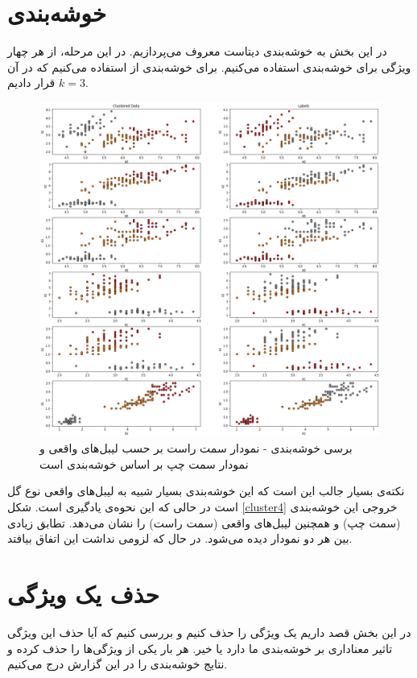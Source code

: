 \documentclass[a4paper]{article}
\begin{document}
\begin{large}
\section{خوشه‌بندی 
}
در این بخش به خوشه‌بندی دیتاست معروف 
می‌پردازیم. در این مرحله، از هر چهار ویژگی برای خوشه‌بندی استفاده می‌کنیم. برای خوشه‌بندی از 
استفاده می‌کنیم که در آن 
$k=3$
قرار دادیم. 
\begin{figure}
	\centering
	\includegraphics[scale=0.4]{cluster4.png}
	\caption{برسی خوشه‌بندی - نمودار سمت راست بر حسب لیبل‌های واقعی و نمودار سمت چپ بر اساس خوشه‌بندی است}
	\label{cluster4}
\end{figure}

نکته‌ی بسیار جالب این است که این خوشه‌بندی بسیار شبیه به لیبل‌های واقعی نوع گل است در حالی که این نحوه‌ی یادگیری 
است. شکل 
\eqref{cluster4}
خروجی این خوشه‌بندی (سمت چپ) و همچنین لیبل‌های واقعی (سمت راست) را نشان می‌دهد. تطابق زیادی بین هر دو نمودار دیده‌ می‌شود. در حال که لزومی نداشت این اتفاق بیافتد.


\section{حذف یک ویژگی}
در این بخش قصد داریم یک ویژگی را حذف کنیم و بررسی کنیم که آیا حذف این ویژگی تاثیر معناداری بر خوشه‌بندی ما دارد یا خیر. هر بار یکی از ویژگی‌ها را حذف کرده و نتایج خوشه‌بندی را در این گزارش درج می‌کنیم.



\end{large}
\end{document}
